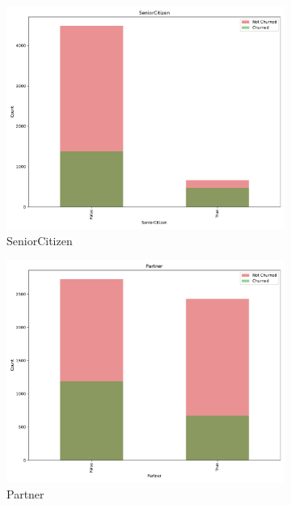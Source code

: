 \documentclass[a4paper,11pt]{article}
\begin{document}
\begin{landscape}
\begin{figure}
    \begin{subfigure}{0.14\linewidth}
        \includegraphics[width=\linewidth]{figures/understanding/SeniorCitizen.pdf}
        \caption{SeniorCitizen}
    \end{subfigure}%
    \begin{subfigure}{0.14\linewidth}
        \includegraphics[width=\linewidth]{figures/understanding/Partner.pdf}
        \caption{Partner}
        \end{subfigure}
    \begin{subfigure}{0.14\linewidth}

\end{subfigure}
\end{figure}
\end{landscape}
\end{document}
